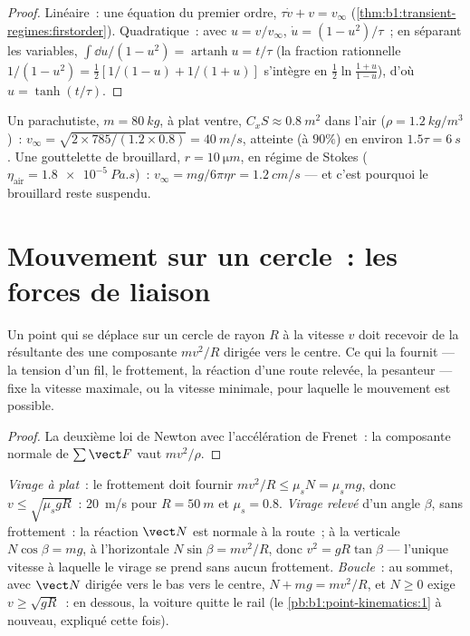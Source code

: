 \begin{proof}
Linéaire~: une équation du premier ordre, $\tau\dot v + v = v_\infty$
(\cref{thm:b1:transient-regimes:firstorder}). Quadratique~: avec
$u = v/v_\infty$, $\dot u = (1 - u^2)/\tau$~; en séparant les variables,
$\int\dd u/(1 - u^2) = \operatorname{artanh}u = t/\tau$ (la fraction
rationnelle $1/(1 - u^2) = \tfrac12[1/(1 - u) + 1/(1 + u)]$ s'intègre en
$\tfrac12\ln\frac{1 + u}{1 - u}$), d'où $u = \tanh(t/\tau)$.
\end{proof}

\begin{example}\label{ex:b1:newton-dynamics:terminal}
Un parachutiste, $m = \qty{80}{kg}$, à plat ventre, $C_xS \approx \qty{0.8}{m^2}$
dans l'air ($\rho = \qty{1.2}{kg/m^3}$)~: $v_\infty = \sqrt{2 \times 785/(1.2
\times 0.8)} = \qty{40}{m/s}$, atteinte (à $90\%$) en environ $1.5\tau =
\qty{6}{s}$. Une gouttelette de brouillard, $r = \qty{10}{\micro m}$, en
régime de Stokes ($\eta_{\text{air}} = \qty{1.8e-5}{Pa.s}$)~: $v_\infty = mg/6\pi\eta r =
\qty{1.2}{cm/s}$ --- et c'est pourquoi le brouillard reste suspendu.
\end{example}

\section{Mouvement sur un cercle~: les forces de liaison}

\begin{proposition}\label{prop:b1:newton-dynamics:centripetal}
Un point qui se déplace sur un cercle de rayon $R$ à la vitesse $v$ doit
recevoir de la résultante des  une composante $mv^2/R$ dirigée
vers le centre. Ce qui la fournit --- la tension d'un fil, le
frottement, la réaction d'une route relevée, la pesanteur --- fixe la
vitesse maximale, ou la vitesse minimale, pour laquelle le mouvement est
possible.
\end{proposition}

\begin{proof}
La deuxième loi de Newton avec l'accélération de Frenet~: la composante
normale de $\sum\vect F$ vaut $mv^2/\rho$.
\end{proof}

\begin{example}\label{ex:b1:newton-dynamics:circles}
\emph{Virage à plat}~: le frottement doit fournir $mv^2/R \leq \mu_sN = \mu_smg$,
donc $v \leq \sqrt{\mu_sgR}$~: \qty{20}{m/s} pour $R = \qty{50}{m}$ et
$\mu_s = 0.8$. \emph{Virage relevé} d'un angle $\beta$, sans
frottement~: la réaction $\vect N$ est normale à la route~; à la
verticale $N\cos\beta = mg$, à l'horizontale $N\sin\beta = mv^2/R$, donc
$v^2 = gR\tan\beta$ --- l'unique vitesse à laquelle le virage se prend
sans aucun frottement. \emph{Boucle}~: au sommet, avec $\vect N$ dirigée
vers le bas vers le centre, $N + mg =
mv^2/R$, et $N \geq 0$ exige $v \geq \sqrt{gR}$~: en dessous, la voiture
quitte le rail (le \cref{pb:b1:point-kinematics:1} à nouveau, expliqué cette fois).
\end{example}

